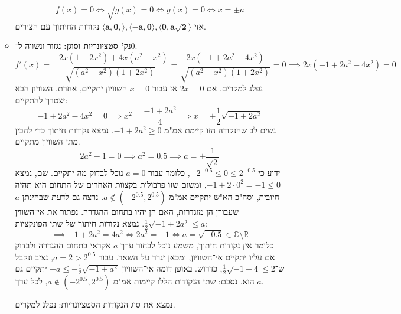 \documentclass[]{article}
\newcommand\R     {\mathbb{R}}
\newcommand\C     {\mathbb{C}}
\newcommand\ra    {\rangle}
\newcommand\la    {\langle}
\begin{document}
\begin{enumerate}
\begin{itemize}
			\[ f(x) = 0 \iff \sqrt{g(x)} = 0 \iff g(x) = 0 \iff x = \pm a \]
			אזי $\bm{\la a, 0, \ra, \la -a, 0 \ra, \la 0, a \sqrt 2 \ra}$ נקודות החיתוך עם הצירים. 
			\item \textbf{נק' סטציונריות וסוגן: }נגזור ונשווה ל־$0$. 
			\[ f'(x) = \frac{-2x(1 + 2x^2) + 4x(a^2 - x^2)}{\sqrt{(a^2 - x^2)(1 + 2x^2)}} = \frac{2x(- 1 + 2a^2 - 4x^2 )}{\sqrt{(a^2 - x^2)(1 + 2x^2)}} = 0 \implies 2x(- 1 + 2a^2 - 4x^2) = 0 \]
				נפלג למקרים. אם $2x = 0 $ אז עבור $x =0$ השוויון יתקיים, אחרת, השוויון הבא יצטרך להתקיים: 
				\[ - 1 + 2a^2 - 4x^2 = 0 \implies x^2 = \frac{-1 + 2a^2}{4} \implies x = \pm \frac{1}{2}\sqrt{-1 + 2a^2} \]
				נשים לב שהנקודה הזו קיימת אמ"מ $-1 + 2a^2 \ge 0$. נמצא נקודות חיתוך כדי להבין מתי השוויון מתקיים. 
				\[2a^2 -1 = 0 \implies a^2 = 0.5 \implies a = \pm \frac{1}{\sqrt 2}\]
				ידוע כי $-2^{-0.5} \le 0 \le 2^{-0.5}$, כלומר עבור $a = 0$ נוכל לבדוק מה יתקיים. שם, נמצא $-1 + 2 \cdot 0^2 = -1 \le 0$, ומשום שזו פרבולות בקצוות האחרים של התחום היא תהיה חיובית, וסה"כ הא"ש יתקיים אמ"מ $a \notin (-2^{0.5}, 2^{0.5})$. נרצה גם לדעת שבהינתן $a$ שעבורן הן מוגדרות, האם הן יהיו בתחום ההגדרה. נפתור את אי־השווין $\frac{1}{2}\sqrt{-1 + 2a^2} \le a $. נמצא נקודות חיתוך של שתי הפונקציות: 
				\[ \implies -1 + 2a^2 = 4a^2 \iff 2a^2 = -1 \iff a = \sqrt{-0.5} \in \C \setminus \R \]
				כלומר אין נקודות חיתוך, משמע נוכל לבחור ערך $a$ אקראי בתחום ההגדרה ולבדוק אם עליו יתקיים אי־השוויון, ומכאן יגרר על השאר. עבור $a = 2 > 2^{0.5}$, נציב ונקבל ש־$\frac{1}{2}\sqrt{-1 + 4} \le  2$, כדרוש. באופן דומה אי־השוויון $-a \le -\frac{1}{2}\sqrt{-1 + a^2}$ יתקיים גם הוא. נסכם: שתי הנקודות הללו קיימות אמ"מ $a \notin (-2^{0.5}, 2^{0.5})$, לכל ערך $a$. 
				
				
				נמצא את סוג הנקודות הסטציונריות: נפלג למקרים. 
				

\end{itemize}
\end{enumerate}
\end{document}
